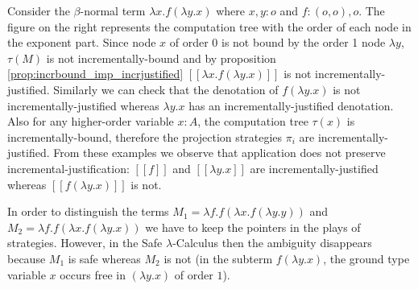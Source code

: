 \documentclass{llncs}
\newcommand{\lsem}{[\![} %
\newcommand{\rsem}{]\!]} %
\newcommand{\sem}[1]{{\lsem #1 \rsem}}
\newcommand{\tree}[2][levelsep=3.5ex]{\pstree[levelsep=3.5ex,#1]{\TR{#2}}}
\begin{document}
\parpic[r]{
    \tree{$\lambda x^3$}{\tree{$f^2$}{ \tree{$\lambda y^1$}{ \TR{$x^0$} }}}
}

\begin{example}
Consider the $\beta$-normal term $\lambda
x . f (\lambda y .x)$ where $x,y:o$ and $f:(o,o),o$. The figure on
the right represents the computation tree with the order of each
node in the exponent part. Since node $x$ of order $0$ is not bound
by the order 1 node $\lambda y$, $\tau(M)$ is not
incrementally-bound and by proposition
\ref{prop:incrbound_imp_incrjustified} $\sem{\lambda x . f (\lambda
y .x)}$ is not incrementally-justified. Similarly we can check that
the denotation of $f (\lambda y .x)$ is not incrementally-justified
whereas $\lambda y. x$ has an incrementally-justified denotation.
Also for any higher-order variable $x:A$, the computation tree
$\tau(x)$ is incrementally-bound, therefore the projection
strategies $\pi_i$ are incrementally-justified. From these examples
we observe that application does not preserve
incremental-justification: $\sem{f}$ and $\sem{\lambda y. x}$ are
incrementally-justified whereas $\sem{f (\lambda y .x)}$ is not.
\end{example}

\begin{example}
In order to distinguish the terms $M_1 = \lambda f . f
(\lambda x . f (\lambda y .y ))$ and $M_2 = \lambda f . f (\lambda x
. f (\lambda y .x ))$ we have to keep the pointers in the plays of
strategies. However, in the Safe $\lambda$-Calculus then the ambiguity disappears because $M_1$ is
safe whereas $M_2$ is not (in the subterm $f (\lambda y . x)$, the
ground type variable $x$ occurs free in $(\lambda y . x)$ of order $1$).
\end{example}
\end{document}
